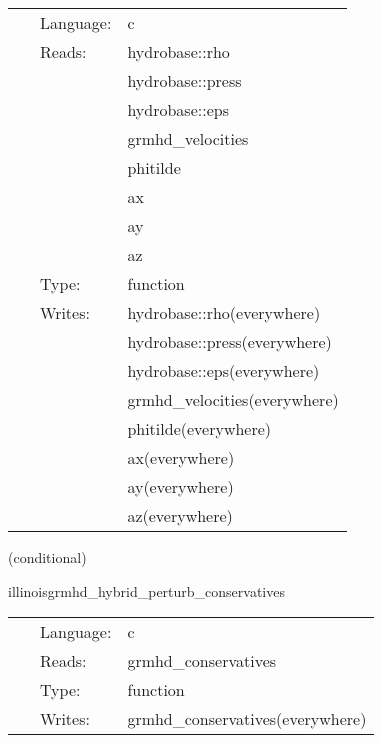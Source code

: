 \documentclass{article}
\begin{document}
\hspace{5mm}

 \begin{tabular*}{160mm}{cll} 
~ & Language:  & c \\ 
~ & Reads:  & hydrobase::rho \\ 
~& ~ &hydrobase::press\\ 
~& ~ &hydrobase::eps\\ 
~& ~ &grmhd\_velocities\\ 
~& ~ &phitilde\\ 
~& ~ &ax\\ 
~& ~ &ay\\ 
~& ~ &az\\ 
~ & Type:  & function \\ 
~ & Writes:  & hydrobase::rho(everywhere) \\ 
~& ~ &hydrobase::press(everywhere)\\ 
~& ~ &hydrobase::eps(everywhere)\\ 
~& ~ &grmhd\_velocities(everywhere)\\ 
~& ~ &phitilde(everywhere)\\ 
~& ~ &ax(everywhere)\\ 
~& ~ &ay(everywhere)\\ 
~& ~ &az(everywhere)\\ 
\end{tabular*} 


\vspace{5mm}

   (conditional) 

\hspace{5mm} illinoisgrmhd\_hybrid\_perturb\_conservatives 

\hspace{5mm}{\it hybrid version of illinoisgrmhd\_perturb\_conservatives } 


\hspace{5mm}

 \begin{tabular*}{160mm}{cll} 
~ & Language:  & c \\ 
~ & Reads:  & grmhd\_conservatives \\ 
~ & Type:  & function \\ 
~ & Writes:  & grmhd\_conservatives(everywhere) \\ 
\end{tabular*} 


\vspace{5mm}
\end{document}
